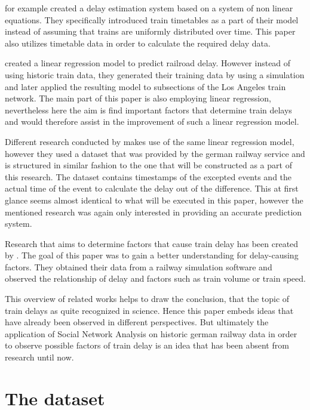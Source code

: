 \documentclass[12pt,a4paper]{article}
\begin{document}
\cite{Cheng90} for example created a delay estimation system based on a system of non linear equations. 
They specifically introduced train timetables as a part of their model instead of assuming that trains are uniformly distributed over time. 
This paper also utilizes timetable data in order to calculate the required delay data.

\cite{Murali2010} created a linear regression model to predict railroad delay. 
However instead of using historic train data, they generated their training data by using a simulation and later applied the resulting model to subsections of the Los Angeles train network. 
The main part of this paper is also employing linear regression, nevertheless here the aim is find important factors that determine train delays and would therefore assist in the improvement of such a linear regression model.

Different research conducted by \cite{Hauck2020} makes use of the same linear regression model, however they used a dataset that was provided by the german railway service and is structured in similar fashion to the one that will be constructed as a part of this research. 
The dataset contains timestamps of the excepted events and the actual time of the event to calculate the delay out of the difference. This at first glance seems almost identical to what will be executed in this paper, however the mentioned research was again only interested in providing an accurate prediction system.

Research that aims to determine factors that cause train delay has been created by \cite{Dingler2010}. The goal of this paper was to gain a better understanding for delay-causing factors. 
They obtained their data from a railway simulation software and observed the relationship of delay and factors such as train volume or train speed.

This overview of related works helps to draw the conclusion, that the topic of train delays as quite recognized in science.
Hence this paper embeds ideas that have already been observed in different perspectives. 
But ultimately the application of Social Network Analysis on historic german railway data in order to observe possible factors of train delay is an idea that has been absent from research until now.  

\maketitle
\section{\label{sec:Dataset}The dataset}
\end{document}
